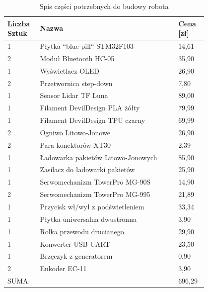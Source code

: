 \begin{table}[H]
    \caption{Spis części potrzebnych do budowy robota}
     \label{tab:parts-list}
    \centering
    \begin{tabular}{ |p{0.1\linewidth}|p{0.6\linewidth}|p{0.1\linewidth}| } \hline
	Liczba Sztuk & Nazwa & Cena [zł] \\ \hline \hline
    1 & Płytka ``blue pill`` STM32F103 \cite{part-list-1} & 14,61 \\ \hline
    2 & Moduł Bluetooth HC-05 \cite{part-list-2} & 35,90 \\ \hline
    1 & Wyświetlacz OLED \cite{part-list-3} & 26,90 \\ \hline
    2 & Przetwornica step-down \cite{part-list-4} & 7,80 \\ \hline
    1 & Sensor Lidar TF Luna \cite{part-list-5} & 89,00 \\ \hline
    1 & Filament DevilDesign PLA żółty \cite{part-list-6} & 79,99 \\ \hline
    1 & Filament DevilDesign TPU czarny \cite{part-list-7} & 69,99 \\ \hline
    2 & Ogniwo Litowo-Jonowe \cite{part-list-8} & 26,90 \\ \hline
    2 & Para konektorów XT30 \cite{part-list-9} & 2,39 \\ \hline
    1 & Ładowarka pakietów Litowo-Jonowych \cite{part-list-10} & 85,90 \\ \hline
    1 & Zasilacz do ładowarki pakietów \cite{part-list-11} & 25,90 \\ \hline
    1 & Serwomechanizm TowerPro MG-90S \cite{part-list-12} & 14,90 \\ \hline
    2 & Serwomechanizm TowerPro MG-995 \cite{part-list-13} & 21,89 \\ \hline
    1 & Przycisk wł/wył z podświetleniem \cite{part-list-14} & 33,34 \\ \hline
    1 & Płytka uniwersalna dwustronna \cite{part-list-15} & 3,90 \\ \hline
    1 & Rolka przewodu drucianego \cite{part-list-16} & 29,90 \\ \hline
    1 & Konwerter USB-UART \cite{part-list-17} & 23,50 \\ \hline
    1 & Brzęczyk z generatorem \cite{part-list-18} & 0,90 \\ \hline
    2 & Enkoder EC-11 \cite{part-list-19} & 3,90 \\ \hline \hline
    \multicolumn{2}{|p{0.7\linewidth}|}{SUMA:} & 696,29 \\ \hline
\end{tabular}
\end{table}

